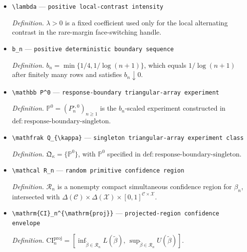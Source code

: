 \documentclass{article}
\begin{document}
\begin{itemize}
  \par\smallskip\noindent\emph{Definition.} \(E_{\mathbb P}^{\star}\) denotes expectation under the multiplier law conditional on the row-\(n\) data generated under \(P_n^\circ\) in experiment \(\mathbb P\).
  \item \texttt{\textbackslash{}\allowbreak{}lambda} --- \texttt{positive local-\allowbreak{}contrast intensity}
  \par\smallskip\noindent\emph{Definition.} \(\lambda>0\) is a fixed coefficient used only for the local alternating contrast in the rare-margin face-switching handle.
  \item \texttt{b\_\allowbreak{}n} --- \texttt{positive deterministic boundary sequence}
  \par\smallskip\noindent\emph{Definition.} \(b_n=\min\{1/4,1/\log(n+1)\}\), which equals \(1/\log(n+1)\) after finitely many rows and satisfies \(b_n\downarrow0\).
  \item \texttt{\textbackslash{}\allowbreak{}mathbb P\textasciicircum{}0} --- \texttt{response-\allowbreak{}boundary triangular-\allowbreak{}array experiment}
  \par\smallskip\noindent\emph{Definition.} \(\mathbb P^0=(P_n^{\circ,0})_{n\geq1}\) is the \(b_n\)-scaled experiment constructed in \(\mathrm{def:response\text{-}boundary\text{-}singleton}\).
  \item \texttt{\textbackslash{}\allowbreak{}mathfrak Q\_\allowbreak{}\{\textbackslash{}\allowbreak{}kappa\}\allowbreak{}} --- \texttt{singleton triangular-\allowbreak{}array experiment class}
  \par\smallskip\noindent\emph{Definition.} \(\mathfrak Q_{\kappa}=\{\mathbb P^0\}\), with \(\mathbb P^0\) specified in \(\mathrm{def:response\text{-}boundary\text{-}singleton}\).
  \item \texttt{\textbackslash{}\allowbreak{}mathcal R\_\allowbreak{}n} --- \texttt{random primitive confidence region}
  \par\smallskip\noindent\emph{Definition.} \(\mathcal R_n\) is a nonempty compact simultaneous confidence region for \(\beta_n\), intersected with \(\Delta(\mathcal C)\times\Delta(\mathcal X)\times[0,1]^{\mathcal C\times\mathcal X}\).
  \item \texttt{\textbackslash{}\allowbreak{}mathrm\{CI\}\allowbreak{}\_\allowbreak{}n\textasciicircum{}\{\textbackslash{}\allowbreak{}mathrm\{proj\}\allowbreak{}\}\allowbreak{}} --- \texttt{projected-\allowbreak{}region confidence envelope}
  \par\smallskip\noindent\emph{Definition.} \(\mathrm{CI}_n^{\mathrm{proj}}=[\inf_{\widetilde\beta\in\mathcal R_n}L(\widetilde\beta),\,\sup_{\widetilde\beta\in\mathcal R_n}U(\widetilde\beta)]\).

\end{itemize}
\end{document}
